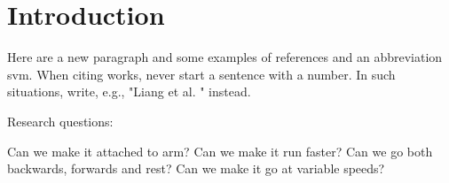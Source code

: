 \section{Introduction}
\label{section:intro}
\blindtext

Here are a new paragraph and some examples of references and an abbreviation \cite{IEEEtran, IEEEtranformatexample, webpage, FundConDep, exampleofjournalarticle, exampleofconferencepaper}
\ac{svm}. When citing works, never start a sentence with a number. In such situations, write, e.g., "Liang et al. \cite{exampleofconferencepaper}" instead.


Research questions:

Can we make it attached to arm?
Can we make it run faster?
Can we go both backwards, forwards and rest?
Can we make it go at variable speeds?
